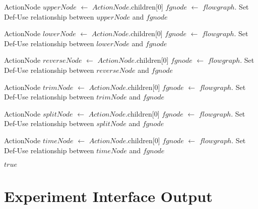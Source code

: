 \begin{appendices}
\begin{algorithm}
\begin{algorithmic}[1]
      \State ActionNode $upperNode$ $\gets$ $ActionNode$.children[0]
      \State $fgnode$ $\gets$ $flowgraph$.
      \State Set Def-Use relationship between $upperNode$ and $fgnode$
    \EndCase

      \State ActionNode $lowerNode$ $\gets$ $ActionNode$.children[0]
      \State $fgnode$ $\gets$ $flowgraph$.
      \State Set Def-Use relationship between $lowerNode$ and $fgnode$
    \EndCase

      \State ActionNode $reverseNode$ $\gets$ $ActionNode$.children[0]
      \State $fgnode$ $\gets$ $flowgraph$.
      \State Set Def-Use relationship between $reverseNode$ and $fgnode$
    \EndCase

\end{algorithmic}
\end{algorithm}


\begin{algorithm}
\begin{algorithmic}[1]
      \State ActionNode $trimNode$ $\gets$ $ActionNode$.children[0]
      \State $fgnode$ $\gets$ $flowgraph$.
      \State Set Def-Use relationship between $trimNode$ and $fgnode$
    \EndCase

      \State ActionNode $splitNode$ $\gets$ $ActionNode$.children[0]
      \State $fgnode$ $\gets$ $flowgraph$.
      \State Set Def-Use relationship between $splitNode$ and $fgnode$
    \EndCase

      \State ActionNode $timeNode$ $\gets$ $ActionNode$.children[0]
      \State $fgnode$ $\gets$ $flowgraph$.
      \State Set Def-Use relationship between $timeNode$ and $fgnode$
    \EndCase

  \EndSwitch

  \Return $true$
\EndFunction
\end{algorithmic}
\end{algorithm}



\chapter{Experiment Interface Output}
\label{appendix:output}


\end{appendices}
